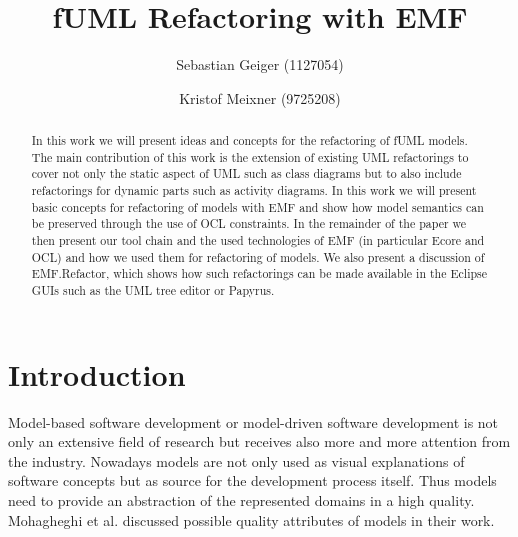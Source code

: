 \documentclass{llncs}
\begin{document}
\pagestyle{plain}

\title{fUML Refactoring with EMF}


\author{Sebastian Geiger (1127054) \and Kristof Meixner (9725208)}
\maketitle

\begin{abstract}
In this work we will present ideas and concepts for the refactoring of fUML models. The main contribution of this work is 
the extension of existing UML refactorings to cover not only the static aspect of UML such as class diagrams but to also 
include refactorings for dynamic
parts such as activity diagrams. In this work we will present basic concepts for refactoring of models with EMF and show how model semantics can be
preserved through the use of OCL constraints. In the remainder of the paper we then present our tool chain and the used technologies
of EMF (in particular Ecore and OCL) and how we used them for refactoring of models. We also present a discussion of EMF.Refactor, which shows how such refactorings
can be made available in the Eclipse GUIs such as the UML tree editor or Papyrus.
\end{abstract}

\tableofcontents
\newpage


\section{Introduction}

Model-based software development or model-driven software development is not only an extensive field of research but
receives also more and more attention from the industry. Nowadays models are not only used as visual explanations of
software concepts but as source for the development process itself. Thus models need to provide an abstraction of
the represented domains in a high quality. Mohagheghi et al. \cite{DBLP:journals/infsof/MohagheghiDN09} discussed possible 
quality attributes of models in their work.
\end{document}
